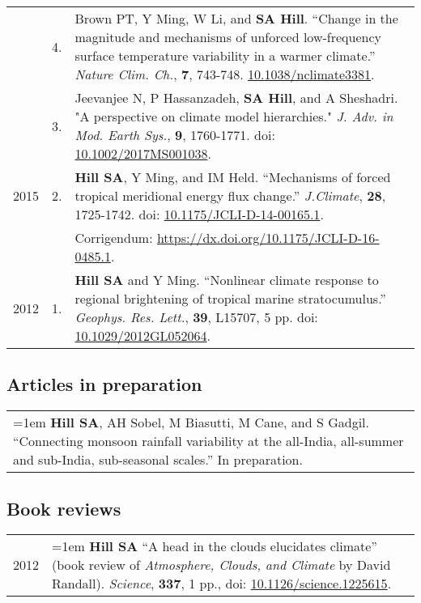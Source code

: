 \documentclass[letterpaper,11pt]{shillcv}
\begin{document}
\begin{longtable}{@{} >{\color{darkgray}} p{} >{\color{black}} p{} @{} p{} @{}}
     & 4. & Brown PT, Y Ming, W Li, and \textbf{SA Hill}.  ``Change
in the magnitude and mechanisms of unforced low-frequency surface temperature
variability in a warmer climate.''  \emph{Nature Clim. Ch.}, \textbf{7}, 743-748.  \href{https://doi.org/10.1038/nclimate3381}{10.1038/nclimate3381}.\\
     & 3. & Jeevanjee N, P Hassanzadeh, \textbf{SA Hill}, and A Sheshadri.  "A perspective on climate model hierarchies."  \emph{J.  Adv. in Mod. Earth Sys.}, \textbf{9}, 1760-1771.  doi: \href{https://doi.org/10.1002/2017MS001038}{10.1002/2017MS001038}.\\
2015 & 2. & \textbf{Hill SA}, Y Ming, and IM Held.  ``Mechanisms of forced
tropical meridional energy flux change.''  \emph{J.\@ Climate}, \textbf{28}, 1725-1742.  doi: \href{http://dx.doi.org/10.1175/JCLI-D-14-00165.1}{10.1175/JCLI-D-14-00165.1}.\\
& & \hspace{1cm} Corrigendum: \href{https://dx.doi.org/10.1175/JCLI-D-16-0485.1}{https://dx.doi.org/10.1175/JCLI-D-16-0485.1}.\\
2012 & 1. & \textbf{Hill SA} and Y Ming.  ``Nonlinear climate response to regional
brightening of tropical marine stratocumulus.''  \emph{Geophys. Res. Lett.},
\textbf{39}, L15707, 5 pp.  doi: \href{http://dx.doi.org/10.1029/2012GL052064}{10.1029/2012GL052064}.\\
\end{longtable}


\subsection*{Articles in preparation}
\begin{longtable}{@{} p{\textwidth} @{}}

\hangindent=1em \textbf{Hill SA}, AH Sobel, M Biasutti, M Cane, and S Gadgil.  ``Connecting monsoon rainfall variability at the all-India, all-summer and sub-India, sub-seasonal scales.''  In preparation.\\

\end{longtable}

\subsection*{Book reviews}
\begin{longtable}{@{}  >{\color{darkgray}} p{} p{} @{}}
2012 & \hangindent=1em \textbf{Hill SA}  ``A head in the clouds elucidates climate'' (book
review of \emph{Atmosphere, Clouds, and Climate} by David Randall).  \emph{Science}, \textbf{337},
1 pp., doi: \href{http://dx.doi.org/10.1126/science.1225615}{10.1126/science.1225615}.\\
\end{longtable}
\end{document}
